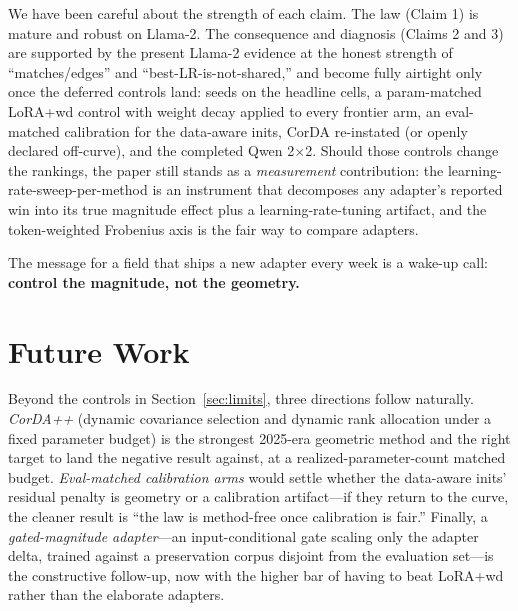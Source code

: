\documentclass[11pt]{article}
\begin{document}
We have been careful about the strength of each claim. The law (Claim 1) is mature and
robust on Llama-2. The consequence and diagnosis (Claims 2 and 3) are supported by the
present Llama-2 evidence at the honest strength of ``matches/edges'' and
``best-LR-is-not-shared,'' and become fully airtight only once the deferred controls land:
seeds on the headline cells, a param-matched LoRA{+}wd control with weight decay applied
to every frontier arm, an eval-matched calibration for the data-aware inits, CorDA
re-instated (or openly declared off-curve), and the completed Qwen 2$\times$2. Should
those controls change the rankings, the paper still stands as a \emph{measurement}
contribution: the learning-rate-sweep-per-method is an instrument that decomposes any
adapter's reported win into its true magnitude effect plus a learning-rate-tuning
artifact, and the token-weighted Frobenius axis is the fair way to compare adapters.

The message for a field that ships a new adapter every week is a wake-up call:
\textbf{control the magnitude, not the geometry.}

\section*{Future Work}
Beyond the controls in Section~\ref{sec:limits}, three directions follow naturally.
\emph{CorDA++} (dynamic covariance selection and dynamic rank allocation under a fixed
parameter budget) is the strongest 2025-era geometric method and the right target to land
the negative result against, at a realized-parameter-count matched budget. \emph{Eval-matched
calibration arms} would settle whether the data-aware inits' residual penalty is geometry
or a calibration artifact---if they return to the curve, the cleaner result is ``the law
is method-free once calibration is fair.'' Finally, a \emph{gated-magnitude adapter}---an
input-conditional gate scaling only the adapter delta, trained against a preservation
corpus disjoint from the evaluation set---is the constructive follow-up, now with the
higher bar of having to beat LoRA{+}wd rather than the elaborate adapters.

\end{document}
